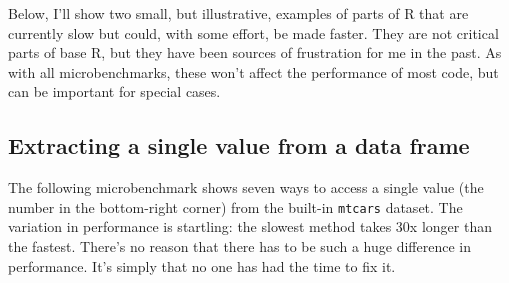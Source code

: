 Below, I'll show two small, but illustrative, examples of parts of R
that are currently slow but could, with some effort, be made faster.
They are not critical parts of base R, but they have been sources of
frustration for me in the past. As with all microbenchmarks, these won't
affect the performance of most code, but can be important for special
cases.

\subsection{Extracting a single value from a data frame}

The following microbenchmark shows seven ways to access a single value
(the number in the bottom-right corner) from the built-in
\texttt{mtcars} dataset. The variation in performance is startling: the
slowest method takes 30x longer than the fastest. There's no reason that
there has to be such a huge difference in performance. It's simply that
no one has had the time to fix it. 
\indexc{[}

\begin{Shaded}
\begin{Highlighting}[]
\NormalTok{(}
        \NormalTok{=}\StringTok{ }\NormalTok{mtcars[}\NormalTok{, }\NormalTok{],}
       \NormalTok{=}\StringTok{ }\NormalTok{mtcars$carb[}\NormalTok{],}
   \NormalTok{=}\StringTok{ }\NormalTok{mtcars[[}\NormalTok{(}\NormalTok{, }\NormalTok{)]],}
      \NormalTok{=}\StringTok{ }\NormalTok{mtcars[[}\NormalTok{]][}\NormalTok{],}
        \NormalTok{=}\StringTok{ }\NormalTok{)[}\NormalTok{]}
\NormalTok{)}
\end{Highlighting}
\end{Shaded}

